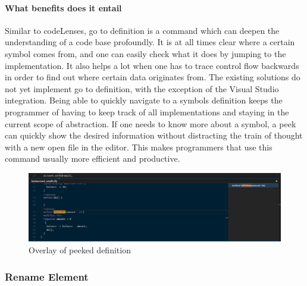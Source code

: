 \paragraph{What benefits does it entail}
Similar to codeLenses, go to definition is a command which can deepen the understanding of a code base profoundly. It is at all times clear where a certain symbol comes from, and one can easily check what it does by jumping to the implementation. It also helps a lot when one has to trace control flow backwards in order to find out where certain data originates from. \newline
The existing solutions do not yet implement go to definition, with the exception of the Visual Studio integration. Being able to quickly navigate to a symbols definition keeps the programmer of having to keep track of all implementations and staying in the current scope of abstraction. If one needs to know more about a symbol, a peek can quickly show the desired information without distracting the train of thought with a new open file in the editor. This makes programmers that use this command usually more efficient and productive.\newline
\begin{figure}[H]
	\centering
	\includegraphics[width=1\textwidth]{img/goToDefinitionPeek}
	\caption{Overlay of peeked definition}
	\label{fig:aggotodefinitionpeek}
\end{figure}
\subsubsection{Rename Element} \label{agrenameelement}
